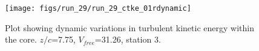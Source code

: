 \begin{figure}[H]
\centering
\texttt{[image: figs/run\_29/run\_29\_ctke\_01rdynamic]}
\caption{Plot showing dynamic variations in turbulent kinetic energy within the core. $z/c$=7.75, $V_{free}$=31.26, station 3.}
\label{fig:run_29_ctke_01rdynamic}
\end{figure}


